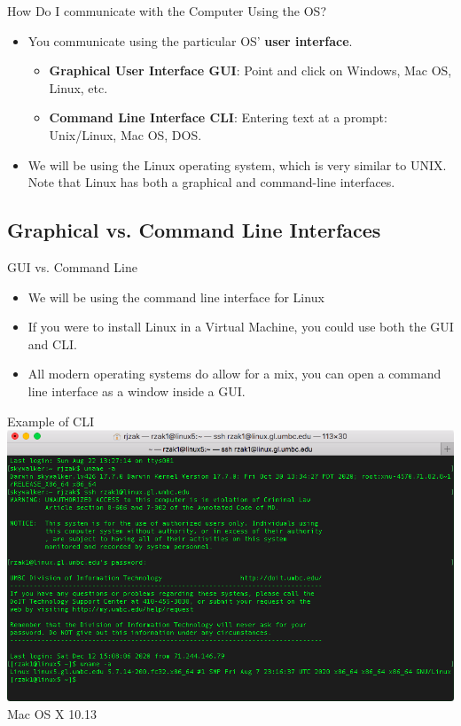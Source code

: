 \documentclass[graphics]{beamer}
\begin{document}
\begin{frame}{How Do I communicate with the Computer Using the OS?}
    \begin{itemize}
        \item You communicate using the particular OS' \textbf{user interface}.
        \begin{itemize}
            \item \textbf{Graphical User Interface GUI}: Point and click on Windows, Mac OS, Linux, etc.
            \item \textbf{Command Line Interface CLI}: Entering text at a prompt: Unix/Linux, Mac OS, DOS.
        \end{itemize}
        \item We will be using the Linux operating system, which is very similar to UNIX. Note that Linux has both a graphical and command-line interfaces.
    \end{itemize}
\end{frame}

\subsection{Graphical vs. Command Line Interfaces}
\begin{frame}{GUI vs. Command Line}
    \begin{itemize}
        \item We will be using the command line interface for Linux
        \item If you were to install Linux in a Virtual Machine, you could use both the GUI and CLI.
        \item All modern operating systems do allow for a mix, you can open a command line interface as a window inside a GUI.
    \end{itemize}
\end{frame}

\begin{frame}{Example of CLI}
    \includegraphics[scale=0.43]{L03_OperatingSystems/L3_SSH.png}
    \footnotesize{Mac OS X 10.13}
\end{frame}
\end{document}
